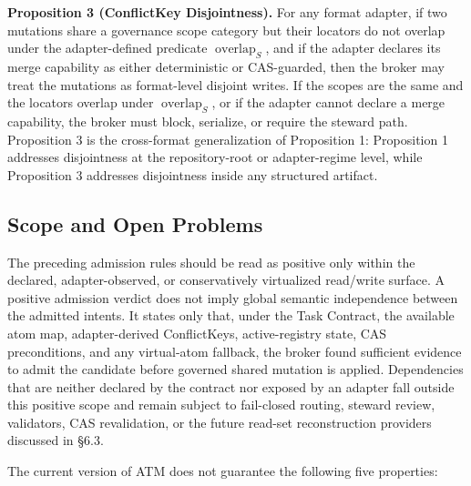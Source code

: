 \documentclass[9pt,letterpaper]{extarticle}
\begin{document}
\textbf{Proposition 3 (ConflictKey Disjointness).} For any format adapter, if two mutations share a governance scope category but their locators do not overlap under the adapter-defined predicate $\operatorname{overlap}_{S}$, and if the adapter declares its merge capability as either deterministic or CAS-guarded, then the broker may treat the mutations as format-level disjoint writes. If the scopes are the same and the locators overlap under $\operatorname{overlap}_{S}$, or if the adapter cannot declare a merge capability, the broker must block, serialize, or require the steward path. Proposition 3 is the cross-format generalization of Proposition 1: Proposition 1 addresses disjointness at the repository-root or adapter-regime level, while Proposition 3 addresses disjointness inside any structured artifact.

\subsection{Scope and Open Problems}

The preceding admission rules should be read as positive only within the declared, adapter-observed, or conservatively virtualized read/write surface. A positive admission verdict does not imply global semantic independence between the admitted intents. It states only that, under the Task Contract, the available atom map, adapter-derived ConflictKeys, active-registry state, CAS preconditions, and any virtual-atom fallback, the broker found sufficient evidence to admit the candidate before governed shared mutation is applied. Dependencies that are neither declared by the contract nor exposed by an adapter fall outside this positive scope and remain subject to fail-closed routing, steward review, validators, CAS revalidation, or the future read-set reconstruction providers discussed in §6.3.

The current version of ATM does not guarantee the following five properties:
\end{document}
